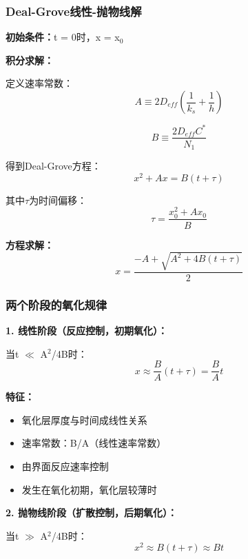 \documentclass[UTF8,12pt,a4paper]{ctexart}
\begin{document}
\subsubsection{Deal-Grove线性-抛物线解}

\textbf{初始条件：}t = 0时，x = x$_0$

\textbf{积分求解：}

定义速率常数：
\begin{equation}
A \equiv 2D_{eff}(\frac{1}{k_s} + \frac{1}{h})
\end{equation}

\begin{equation}
B \equiv \frac{2D_{eff}C^*}{N_1}
\end{equation}

得到Deal-Grove方程：
\begin{equation}
x^2 + Ax = B(t + \tau)
\end{equation}

其中$\tau$为时间偏移：
\begin{equation}
\tau = \frac{x_0^2 + Ax_0}{B}
\end{equation}

\textbf{方程求解：}
\begin{equation}
x = \frac{-A + \sqrt{A^2 + 4B(t + \tau)}}{2}
\end{equation}

\subsubsection{两个阶段的氧化规律}

\textbf{1. 线性阶段（反应控制，初期氧化）：}

当t $\ll$ A$^2$/4B时：
\begin{equation}
x \approx \frac{B}{A}(t + \tau) = \frac{B}{A}t
\end{equation}

\textbf{特征：}
\begin{itemize}
    \item 氧化层厚度与时间成线性关系
    \item 速率常数：B/A（线性速率常数）
    \item 由界面反应速率控制
    \item 发生在氧化初期，氧化层较薄时
\end{itemize}

\textbf{2. 抛物线阶段（扩散控制，后期氧化）：}

当t $\gg$ A$^2$/4B时：
\begin{equation}
x^2 \approx B(t + \tau) \approx Bt
\end{equation}
\end{document}
